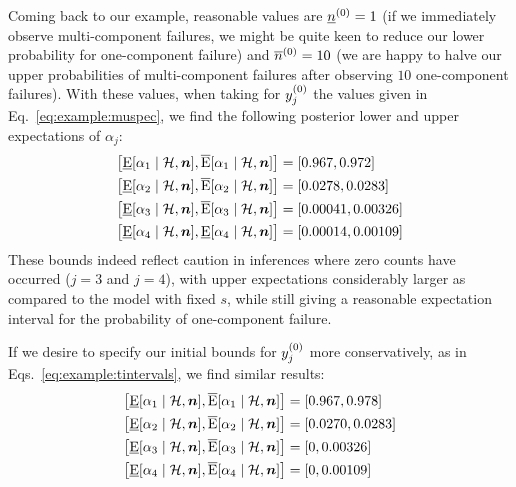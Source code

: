 Coming back to our example, reasonable values are $\underline{n}^{(0)}=1$
(if we immediately observe multi-component failures,
we might be quite keen to reduce our lower probability for one-component failure)
and $\overline{n}^{(0)}=10$ (we are happy to halve our upper probabilities of
multi-component failures after observing $10$ one-component failures).
With these values, when taking for $y^{(0)}_j$ the values given in Eq.~\eqref{eq:example:muspec},
we find the following posterior lower and upper expectations of $\alpha_j$:
\begin{subequations}
\begin{align}
  \big[
  \El[\alpha_1\mid\mathcal{H},\vec{n}] %
  ,
  \Eu[\alpha_1\mid\mathcal{H},\vec{n}] %
  \big]
  &=
  [
  0.967
  ,
  0.972
  ]
  \\
  \big[
  \El[\alpha_2\mid\mathcal{H},\vec{n}] %
  ,
  \Eu[\alpha_2\mid\mathcal{H},\vec{n}] %
  \big]
  &=
  [
  0.0278
  ,
  0.0283
  ]
  \\
  \big[
  \El[\alpha_3\mid\mathcal{H},\vec{n}] %
  ,
  \Eu[\alpha_3\mid\mathcal{H},\vec{n}] %
  \big]
  &=
  [
  0.00041
  ,
  0.00326
  ]
  \\
  \big[
  \El[\alpha_4\mid\mathcal{H},\vec{n}] %
  ,
  \El[\alpha_4\mid\mathcal{H},\vec{n}] %
  \big]
  &=
  [
  0.00014
  ,
  0.00109
  ]
\end{align}
\end{subequations}
These bounds indeed reflect caution in inferences where zero counts have occurred ($j=3$ and $j=4$),
with upper expectations considerably larger as compared to the model with fixed $s$,
while still giving a reasonable expectation interval for the probability of one-component failure.

If we desire to specify our initial bounds for $y^{(0)}_j$ more conservatively,
as in Eqs.~\eqref{eq:example:tintervals}, we find similar results:
\begin{subequations}\label{eq:alphabounds}
\begin{align}
  \big[
  \El[\alpha_1\mid\mathcal{H},\vec{n}] %
  ,
  \Eu[\alpha_1\mid\mathcal{H},\vec{n}] %
  \big]
  &=
  [
  0.967
  ,
  0.978
  ]
  \\
  \big[
  \El[\alpha_2\mid\mathcal{H},\vec{n}] %
  ,
  \Eu[\alpha_2\mid\mathcal{H},\vec{n}] %
  \big]
  &=
  [
  0.0270
  ,
  0.0283
  ]
  \\
  \big[
  \El[\alpha_3\mid\mathcal{H},\vec{n}] %
  ,
  \Eu[\alpha_3\mid\mathcal{H},\vec{n}] %
  \big]
  &=
  [
  0
  ,
  0.00326
  ]
  \\
  \big[
  \El[\alpha_4\mid\mathcal{H},\vec{n}] %
  ,
  \Eu[\alpha_4\mid\mathcal{H},\vec{n}] %
  \big]
  &=
  [
  0
  ,
  0.00109
  ]
\end{align}
\end{subequations}

